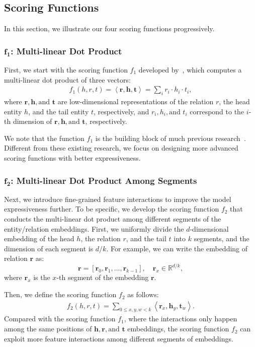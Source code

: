 \documentclass[11pt,a4paper]{article}
\newcommand{\SegVec}[1]{\mathbf{#1}}
\begin{document}
\subsection{Scoring Functions}
In this section, we illustrate our four scoring functions progressively.

\subsubsection{$\bm{f_1}$: Multi-linear Dot Product}
First, we start with the scoring function $f_1$ developed by~\citet{yang2015embedding}, which computes a multi-linear dot product of three vectors:
\begin{align}
f_1(h, r, t) = \left< \SegVec{r}, \SegVec{h}, \SegVec{t}\right> = \sum_{i} r_i \cdot h_i \cdot t_i,
\label{eq:dot-product}
\end{align}
where $\SegVec{r}, \SegVec{h}, \text{and } \SegVec{t}$ are low-dimensional representations of the relation $r$, the head entity $h$, and the tail entity $t$, respectively, and $r_i, h_i, \text{and } t_i$ correspond to the $i$-th dimension of $\SegVec{r}, \SegVec{h}, \text{and } \SegVec{t}$, respectively.

We note that the function $f_1$ is the building block of much previous research~\cite{trouillon2016complex,kadlec2017knowledge,kazemi2018simple}.
Different from these existing research, we focus on designing more advanced scoring functions with better expressiveness.




\subsubsection{$\bm{f_2}$: Multi-linear Dot Product Among Segments}

Next, we introduce fine-grained feature interactions to improve the model expressiveness further.
To be specific, we develop the scoring function $f_2$ that conducts the multi-linear dot product among different segments of the entity/relation embeddings.
First, we uniformly divide the $d$-dimensional embedding of the head $h$, the relation $r$, and the tail $t$ into $k$ segments, and the dimension of each segment is $d/k$.
For example, we can write the embedding of relation $\SegVec{r}$ as:
$$\SegVec{r} = [\SegVec{r}_0, \SegVec{r}_1, \ldots, \SegVec{r}_{k-1}], \quad \SegVec{r}_x \in \mathbb{R}^{d/k},$$
where $\SegVec{r}_x$ is the $x$-th segment of the embedding $\SegVec{r}$.

Then, we define the scoring function $f_2$ as follows:
\begin{align}
f_2(h, r, t) = \sum_{0 \leq x, y, w < k}  \left< \SegVec{r}_x, \SegVec{h}_y, \SegVec{t}_w \right>.
\label{eq:seg-score-function}
\end{align}
Compared with the scoring function $f_1$, where the interactions only happen among the same positions of $\SegVec{h}, \SegVec{r}, \text{and } \SegVec{t}$ embeddings, the scoring function $f_2$ can exploit more feature interactions among different segments of embeddings.
\end{document}
